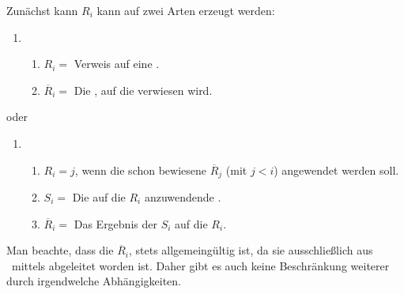 {\begin{enumerate}
	Zunächst kann $R_i$ kann auf zwei Arten erzeugt werden:
	\begin{enumerate}
		\setcounter{enumii}{\value{Enumii}}%
		\item
		\begin{enumerate}
			\item $R_i =$ Verweis auf eine .
			\item $\overline{R}_i =$ Die , auf die verwiesen wird.
		\end{enumerate}
		\setcounter{Enumii}{\value{enumii}}%
	\end{enumerate}
	oder
	\begin{enumerate}
		\item
		\begin{enumerate}
			\item $R_i = j$, wenn die schon bewiesene  $\overline{R}_j$ (mit $j < i$) angewendet werden soll.
			\item $S_i =$ Die auf die  $R_i$ anzuwendende .
			\item $\overline{R}_i =$ Das Ergebnis der  $S_i$ auf die  $R_i$.
		\end{enumerate}
		\setcounter{Enumii}{\value{enumii}}%
	\end{enumerate}
	Man beachte, dass die  $\overline{R}_i$, stets allgemeingültig ist, da sie ausschließlich aus \allgemeingueltigenSchlussregeln\ mittels  abgeleitet worden ist.
	Daher gibt es auch keine Beschränkung weiterer  durch irgendwelche Abhängigkeiten.


\end{enumerate}}

